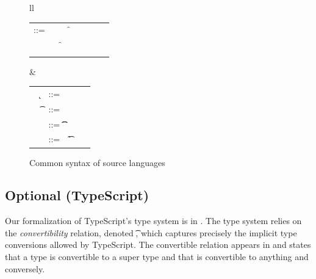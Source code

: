 \documentclass[runnningheads]{tex/llncs}
\begin{document}
\begin{figure}[!h]\hrulefill
	\vspace{2mm}  \small
	
	\begin{tabular}{ll}
		\begin{minipage}{6cm}\begin{tabular}{@{}l@{~}l@{}l@{}l@{}l@{}l@{}l@{}l}
				\e\hspace{.1cm} ::= & \hspace{.2cm} \x        
				&\B \this         
				&\B \FRead\f \\    
				&
				&\B \FWrite\f\e
				&\B \Call\e\m\e \\
				& 
				&\B \that      
				&\B \New\C{\e[1]..}  
		\end{tabular}\end{minipage}&
		\begin{minipage}{5cm}\begin{tabular}{l@{~}l@{}l@{}l}
				~ \k &::= \Class \C {\fd[1]..}{\md[1]..} \\
				~ \t&::= ~ \any  \B   \C \\ 
				\md &::= \Mdef\m\x\t\t\e \\
				~\fd&::= ~ \Fdef\f\t \\ 
		\end{tabular}\end{minipage} 
	\end{tabular}
	\vspace{2mm} 
	\caption{Common syntax of source languages}\label{f:sourcesyntax2}
\end{figure}

\subsection{Optional (TypeScript)}

Our formalization of TypeScript's type system is in
. The type system relies on the \emph{convertibility}
relation, denoted \ConvertE{}\t\tp, which captures precisely the implicit
type conversions allowed by TypeScript.  The convertible relation appears in
 and states that a type is convertible to a super type and
that \any is convertible to anything and conversely. 
\end{document}
